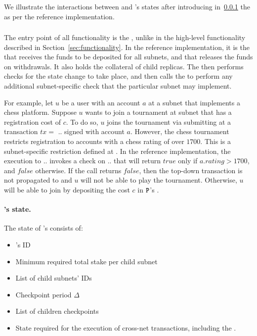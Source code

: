 We illustrate the interactions between \gw and \sa's states after introducing in~\cref{sec:gwrefimpl} the \gw as per the reference implementation.
\subsubsection{\gw}
\label{sec:gwrefimpl}
The entry point of all functionality is the \gw, unlike in the high-level functionality described in Section~\ref{sec:functionality}. In the reference implementation, it is the \gw that receives the funds to be deposited for all subnets, and that releases the funds on withdrawals. It also holds the collateral of child replicas. The \gw then performs checks for the state change to take place, and then calls the \sa to perform any additional subnet-specific check that the particular subnet may implement.

For example, let $u$ be a user with an account $a$ at a subnet  that implements a chess platform. Suppose $u$ wants to join a tournament at subnet  that has a registration cost of $c$. To do so, $u$ joins the tournament via submitting at  a transaction $tx=$ .\gw. signed with account $a$. However, the chess tournament restricts registration to accounts with a chess rating of over $1700$. This is a subnet-specific restriction defined at . In the reference implementation, the execution to .\gw. invokes a check on .. that will return $true$ only if $a.rating> 1700$, and $false$ otherwise. If the call returns $false$, then the top-down transaction is not propagated to  and $u$ will not be able to play the tournament. Otherwise, $u$ will be able to join by depositing the cost $c$ in $\textbf{\texttt{P}}$'s \gw.

\paragraph{\gw's state.} The state of 's \gw consists of: 
\begin{itemize}
    \item {}'s ID
    \item Minimum required total stake per child subnet
    \item List of child subnets' IDs
    \item Checkpoint period $\Delta$
    \item List of children checkpoints
    \item State required for the execution of cross-net transactions, including the \postoffice.
\end{itemize} 

